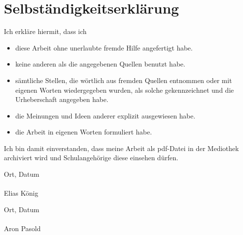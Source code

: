 %

\chapter*{Selbständigkeitserklärung}

\noindent
Ich erkläre hiermit, dass ich
\begin{itemize}
  \item diese Arbeit ohne unerlaubte fremde Hilfe angefertigt habe.
  \item keine anderen als die angegebenen Quellen benutzt habe.
  \item sämtliche Stellen, die wörtlich aus fremden Quellen entnommen
    oder mit eigenen Worten wiedergegeben wurden, als solche
    gekennzeichnet und die Urheberschaft angegeben habe.
  \item die Meinungen und Ideen anderer explizit ausgewiesen habe.
  \item die Arbeit in eigenen Worten formuliert habe.
\end{itemize}

\noindent
Ich bin damit einverstanden, dass meine Arbeit als pdf-Datei in der
Mediothek archiviert wird und Schulangehörige diese einsehen dürfen.


\vspace{3cm}

\noindent
\begin{minipage}{0.45\textwidth}
  Ort, Datum \\[2.5cm]
  \hrulefill \\
  Elias König
\end{minipage}
\hfill
\begin{minipage}{0.45\textwidth}
  Ort, Datum \\[2.5cm]
  \hrulefill \\
  Aron Pasold
\end{minipage}
